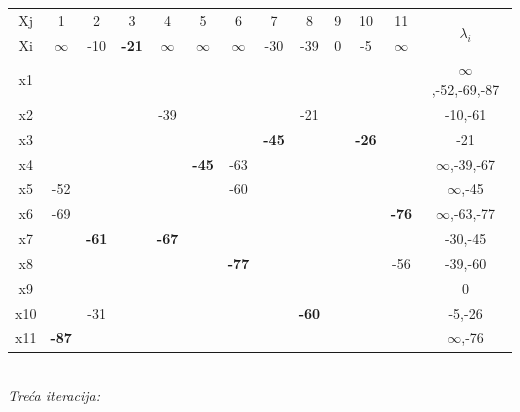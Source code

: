 \documentclass[12pt]{article}
\begin{document}
\begin{enumerate}
\begin{center}
\begin{tabular}{|c|c|c|c|c|c|c|c|c|c|c|c|c|}
\hline
Xj & 1 & 2 & 3 & 4 & 5 & 6 & 7 & 8 & 9 & 10 & 11 & \multirow{2}{*}{$\lambda_i$} \\ \cline{1-12}
Xi & $\infty$ & -10 & \textbf{-21} & $\infty$ & $\infty$ & $\infty$ & -30 & -39 & 0 & -5 & $\infty$ &  \\ \hline
x1 &  &  &  &  &  &  &  &  &  &  &  & $\infty$,-52,-69,-87 \\ \hline
x2 &  &  &  & -39 &  &  &  & -21 &  &  &  & -10,-61 \\ \hline
x3 &  &  &  &  &  &  & \textbf{-45} &  &  & \textbf{-26} &  & -21 \\ \hline
x4 &  &  &  &  & \textbf{-45} & -63 &  &  &  &  &  & $\infty$,-39,-67 \\ \hline
x5 & -52 &  &  &  &  & -60 &  &  &  &  &  & $\infty$,-45 \\ \hline
x6 & -69 &  &  &  &  &  &  &  &  &  & \textbf{-76} & $\infty$,-63,-77 \\ \hline
x7 &  & \textbf{-61} &  & \textbf{-67} &  &  &  &  &  &  &  & -30,-45 \\ \hline
x8 &  &  &  &  &  & \textbf{-77} &  &  &  &  & -56 & -39,-60 \\ \hline
x9 &  &  &  &  &  &  &  &  &  &  &  & 0 \\ \hline
x10 &  & -31 &  &  &  &  &  & \textbf{-60} &  &  &  & -5,-26 \\ \hline
x11 & \textbf{-87} &  &  &  &  &  &  &  &  &  &  & $\infty$,-76 \\ \hline
\end{tabular}%
      \\
      \vspace{0.3cm}
      \textit{Treća iteracija:}



\end{center}
\end{enumerate}
\end{document}
